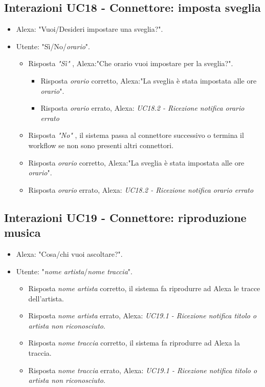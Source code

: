 \subsection{Interazioni UC18 - Connettore: imposta sveglia}
\label{sec:connettore_sveglia}
\begin{itemize}
        \item Alexa: "Vuoi/Desideri impostare una sveglia?".
        \item Utente: "Sì/No/{\it orario}".
        \begin{itemize}
         \item{Risposta {\it "Sì"} }, Alexa:"Che orario vuoi impostare per la sveglia?".
         \begin{itemize}
              \item{Risposta {\it orario} corretto}, Alexa:"La sveglia è stata impostata alle ore {\it orario}".
              \item{Risposta {\it orario} errato}, Alexa:  {\it UC18.2 - Ricezione notifica orario errato}
         \end{itemize}
         \item{Risposta {\it "No"} }, il sistema passa al connettore successivo o termina il workflow se non sono presenti altri connettori.
         \item{Risposta {\it orario} corretto}, Alexa:"La sveglia è stata impostata alle ore {\it orario}".
         \item{Risposta {\it orario} errato}, Alexa:  {\it UC18.2 - Ricezione notifica orario errato}
         \end{itemize}
    \end{itemize}

\subsection{Interazioni UC19 - Connettore: riproduzione musica}
\label{sec:connettore_musica}
 \begin{itemize}
        \item Alexa: "Cosa/chi vuoi ascoltare?".
        \item Utente: "{\it nome artista}/{\it nome traccia}".
        \begin{itemize}
         \item{Risposta {\it nome artista} corretto}, il sistema fa riprodurre ad Alexa le tracce dell'artista.
        \item{Risposta {\it nome artista} errato}, Alexa:  {\it UC19.1 - Ricezione notifica titolo o artista non riconosciuto}.
        \item{Risposta {\it nome traccia} corretto}, il sistema fa riprodurre ad Alexa la traccia.
        \item{Risposta {\it nome traccia} errato}, Alexa:  {\it UC19.1 - Ricezione notifica titolo o artista non riconosciuto}.
         \end{itemize}
    \end{itemize}


